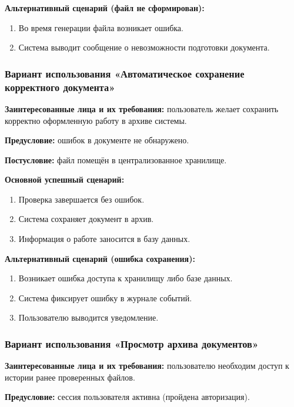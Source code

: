 \textbf{Альтернативный сценарий (файл не сформирован):}

\begin{enumerate}
	\item Во время генерации файла возникает ошибка.
	\item Система выводит сообщение о невозможности подготовки документа.
\end{enumerate}

\subsubsection{Вариант использования «Автоматическое сохранение корректного документа»}

\textbf{Заинтересованные лица и их требования:} пользователь желает сохранить корректно оформленную работу в архиве системы.

\textbf{Предусловие:} ошибок в документе не обнаружено.

\textbf{Постусловие:} файл помещён в централизованное хранилище.

\textbf{Основной успешный сценарий:}

\begin{enumerate}
	\item Проверка завершается без ошибок.
	\item Система сохраняет документ в архив.
	\item Информация о работе заносится в базу данных.
\end{enumerate}

\textbf{Альтернативный сценарий (ошибка сохранения):}

\begin{enumerate}
	\item Возникает ошибка доступа к хранилищу либо базе данных.
	\item Система фиксирует ошибку в журнале событий.
	\item Пользователю выводится уведомление.
\end{enumerate}

\subsubsection{Вариант использования «Просмотр архива документов»}

\textbf{Заинтересованные лица и их требования:} пользователю необходим доступ к истории ранее проверенных файлов.

\textbf{Предусловие:} сессия пользователя активна (пройдена авторизация).

